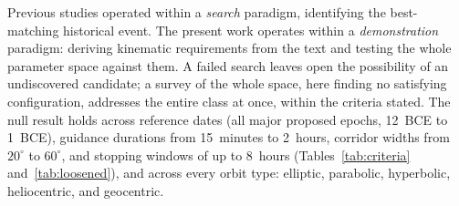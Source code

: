 \documentclass[sn-nature]{sn-jnl}
\begin{document}
Previous studies operated within a \emph{search} paradigm, identifying the
best-matching historical event. The present work operates within a
\emph{demonstration} paradigm: deriving kinematic requirements from the text and
testing the whole parameter space against them. A failed search leaves open the
possibility of an undiscovered candidate; a survey of the whole space, here
finding no satisfying configuration, addresses the entire class at once, within
the criteria stated. The null result holds across reference dates (all major
proposed epochs, 12~BCE to 1~BCE), guidance durations from 15~minutes to 2~hours,
corridor widths from $20^\circ$ to $60^\circ$, and stopping windows of up to
8~hours (Tables~\ref{tab:criteria} and~\ref{tab:loosened}), and across every
orbit type: elliptic, parabolic, hyperbolic, heliocentric, and geocentric.
\end{document}
